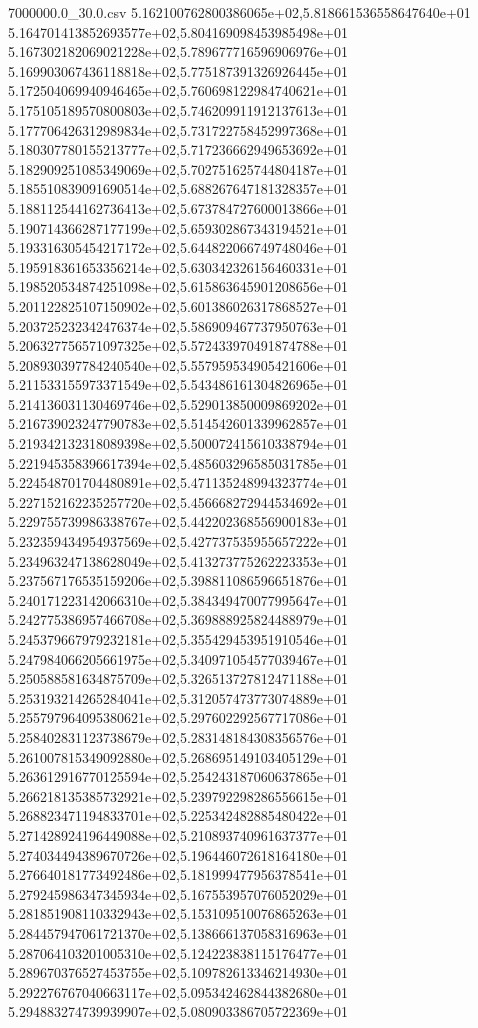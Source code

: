 \begin{filecontents*}{7000000.0_30.0.csv}
5.162100762800386065e+02,5.818661536558647640e+01
5.164701413852693577e+02,5.804169098453985498e+01
5.167302182069021228e+02,5.789677716596906976e+01
5.169903067436118818e+02,5.775187391326926445e+01
5.172504069940946465e+02,5.760698122984740621e+01
5.175105189570800803e+02,5.746209911912137613e+01
5.177706426312989834e+02,5.731722758452997368e+01
5.180307780155213777e+02,5.717236662949653692e+01
5.182909251085349069e+02,5.702751625744804187e+01
5.185510839091690514e+02,5.688267647181328357e+01
5.188112544162736413e+02,5.673784727600013866e+01
5.190714366287177199e+02,5.659302867343194521e+01
5.193316305454217172e+02,5.644822066749748046e+01
5.195918361653356214e+02,5.630342326156460331e+01
5.198520534874251098e+02,5.615863645901208656e+01
5.201122825107150902e+02,5.601386026317868527e+01
5.203725232342476374e+02,5.586909467737950763e+01
5.206327756571097325e+02,5.572433970491874788e+01
5.208930397784240540e+02,5.557959534905421606e+01
5.211533155973371549e+02,5.543486161304826965e+01
5.214136031130469746e+02,5.529013850009869202e+01
5.216739023247790783e+02,5.514542601339962857e+01
5.219342132318089398e+02,5.500072415610338794e+01
5.221945358396617394e+02,5.485603296585031785e+01
5.224548701704480891e+02,5.471135248994323774e+01
5.227152162235257720e+02,5.456668272944534692e+01
5.229755739986338767e+02,5.442202368556900183e+01
5.232359434954937569e+02,5.427737535955657222e+01
5.234963247138628049e+02,5.413273775262223353e+01
5.237567176535159206e+02,5.398811086596651876e+01
5.240171223142066310e+02,5.384349470077995647e+01
5.242775386957466708e+02,5.369888925824488979e+01
5.245379667979232181e+02,5.355429453951910546e+01
5.247984066205661975e+02,5.340971054577039467e+01
5.250588581634875709e+02,5.326513727812471188e+01
5.253193214265284041e+02,5.312057473773074889e+01
5.255797964095380621e+02,5.297602292567717086e+01
5.258402831123738679e+02,5.283148184308356576e+01
5.261007815349092880e+02,5.268695149103405129e+01
5.263612916770125594e+02,5.254243187060637865e+01
5.266218135385732921e+02,5.239792298286556615e+01
5.268823471194833701e+02,5.225342482885480422e+01
5.271428924196449088e+02,5.210893740961637377e+01
5.274034494389670726e+02,5.196446072618164180e+01
5.276640181773492486e+02,5.181999477956378541e+01
5.279245986347345934e+02,5.167553957076052029e+01
5.281851908110332943e+02,5.153109510076865263e+01
5.284457947061721370e+02,5.138666137058316963e+01
5.287064103201005310e+02,5.124223838115176477e+01
5.289670376527453755e+02,5.109782613346214930e+01
5.292276767040663117e+02,5.095342462844382680e+01
5.294883274739939907e+02,5.080903386705722369e+01

\end{filecontents*}
